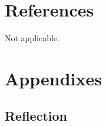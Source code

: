 \documentclass{article}
\begin{document}
\section{References}
    \noindent Not applicable.
\newpage
\section{Appendixes}
\subsection{Reflection}

\end{document}
